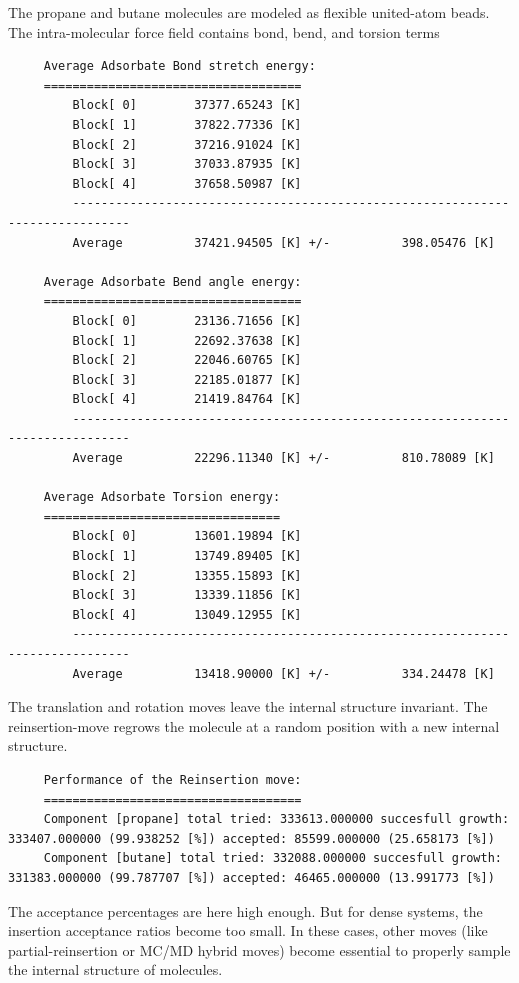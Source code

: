 The propane and butane molecules are modeled as flexible united-atom beads.
The intra-molecular force field contains bond, bend, and torsion terms
\begin{tiny}
\begin{verbatim}
     Average Adsorbate Bond stretch energy:
     ====================================
         Block[ 0]        37377.65243 [K]
         Block[ 1]        37822.77336 [K]
         Block[ 2]        37216.91024 [K]
         Block[ 3]        37033.87935 [K]
         Block[ 4]        37658.50987 [K]
         ------------------------------------------------------------------------------
         Average          37421.94505 [K] +/-          398.05476 [K]
     
     Average Adsorbate Bend angle energy:
     ====================================
         Block[ 0]        23136.71656 [K]
         Block[ 1]        22692.37638 [K]
         Block[ 2]        22046.60765 [K]
         Block[ 3]        22185.01877 [K]
         Block[ 4]        21419.84764 [K]
         ------------------------------------------------------------------------------
         Average          22296.11340 [K] +/-          810.78089 [K]
     
     Average Adsorbate Torsion energy:
     =================================
         Block[ 0]        13601.19894 [K]
         Block[ 1]        13749.89405 [K]
         Block[ 2]        13355.15893 [K]
         Block[ 3]        13339.11856 [K]
         Block[ 4]        13049.12955 [K]
         ------------------------------------------------------------------------------
         Average          13418.90000 [K] +/-          334.24478 [K]
\end{verbatim}
\end{tiny}
The translation and rotation moves leave the internal structure invariant.
The reinsertion-move regrows the molecule at a random position with a new internal structure.
\begin{tiny}
\begin{verbatim}
     Performance of the Reinsertion move:
     ====================================
     Component [propane] total tried: 333613.000000 succesfull growth: 333407.000000 (99.938252 [%]) accepted: 85599.000000 (25.658173 [%])
     Component [butane] total tried: 332088.000000 succesfull growth: 331383.000000 (99.787707 [%]) accepted: 46465.000000 (13.991773 [%])
\end{verbatim}
\end{tiny}
The acceptance percentages are here high enough. But for dense systems, the insertion acceptance ratios become too small.
In these cases, other moves (like partial-reinsertion or MC/MD hybrid moves) become essential to properly sample the internal structure of molecules.

